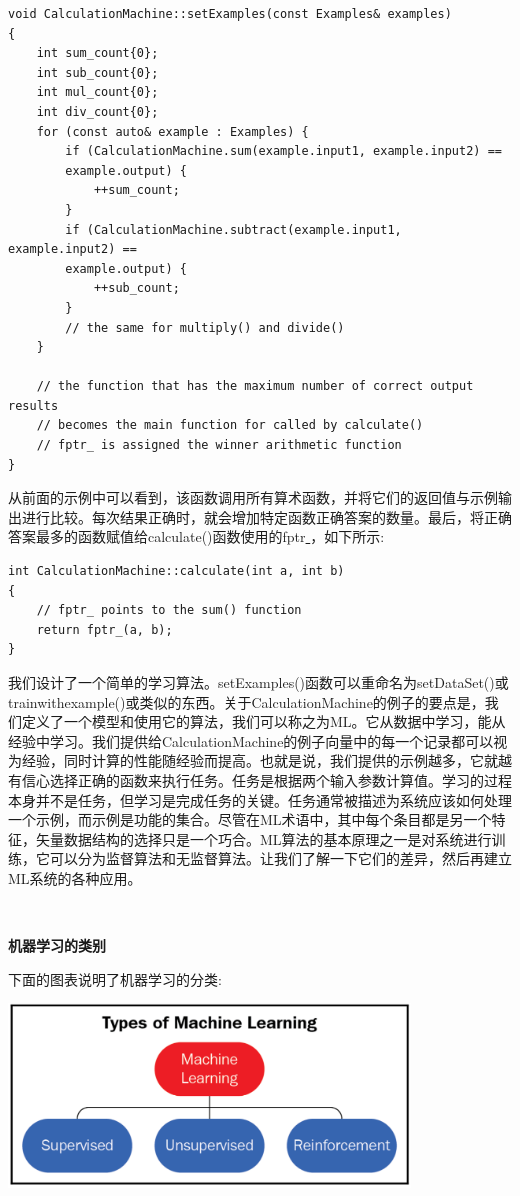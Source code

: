 \begin{lstlisting}[caption={}]
void CalculationMachine::setExamples(const Examples& examples)
{
	int sum_count{0};
	int sub_count{0};
	int mul_count{0};
	int div_count{0};
	for (const auto& example : Examples) {
		if (CalculationMachine.sum(example.input1, example.input2) ==
		example.output) {
			++sum_count;
		}
		if (CalculationMachine.subtract(example.input1, example.input2) ==
		example.output) {
			++sub_count;
		}
		// the same for multiply() and divide()
	}

	// the function that has the maximum number of correct output results
	// becomes the main function for called by calculate()
	// fptr_ is assigned the winner arithmetic function
}
\end{lstlisting}

从前面的示例中可以看到，该函数调用所有算术函数，并将它们的返回值与示例输出进行比较。每次结果正确时，就会增加特定函数正确答案的数量。最后，将正确答案最多的函数赋值给calculate()函数使用的fptr\underline{ }，如下所示: \par

\begin{lstlisting}[caption={}]
int CalculationMachine::calculate(int a, int b)
{
	// fptr_ points to the sum() function
	return fptr_(a, b);
}
\end{lstlisting}

我们设计了一个简单的学习算法。setExamples()函数可以重命名为setDataSet()或trainwithexample()或类似的东西。关于CalculationMachine的例子的要点是，我们定义了一个模型和使用它的算法，我们可以称之为ML。它从数据中学习，能从经验中学习。我们提供给CalculationMachine的例子向量中的每一个记录都可以视为经验，同时计算的性能随经验而提高。也就是说，我们提供的示例越多，它就越有信心选择正确的函数来执行任务。任务是根据两个输入参数计算值。学习的过程本身并不是任务，但学习是完成任务的关键。任务通常被描述为系统应该如何处理一个示例，而示例是功能的集合。尽管在ML术语中，其中每个条目都是另一个特征，矢量数据结构的选择只是一个巧合。ML算法的基本原理之一是对系统进行训练，它可以分为监督算法和无监督算法。让我们了解一下它们的差异，然后再建立ML系统的各种应用。 \par

\noindent\textbf{}\ \par
\textbf{机器学习的类别} \ \par
下面的图表说明了机器学习的分类: \par

\begin{center}
	\includegraphics[width=0.8\textwidth]{content/Section-3/Chapter-15/6}
\end{center}

